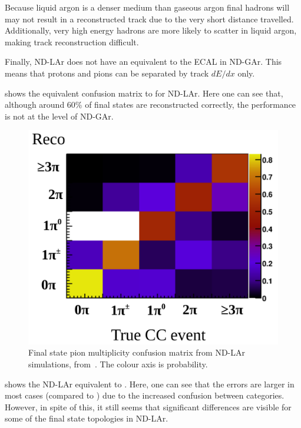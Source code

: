 Because liquid argon is a denser medium than gaseous argon final hadrons will may not result in a reconstructed track due to the very short distance travelled.
Additionally, very high energy hadrons are more likely to scatter in liquid argon, making track reconstruction difficult.

Finally, ND-LAr does not have an equivalent to the ECAL in ND-GAr.
This means that protons and pions can be separated by track $dE/dx$ only.

 shows the equivalent confusion matrix to  for ND-LAr.
Here one can see that, although around 60\% of final states are reconstructed correctly, the performance is not at the level of ND-GAr.

\begin{figure}[h]
	\centering
	\includegraphics[width=.6\linewidth]{files/figures/dune_ndrwt/larConfusMat}
	\caption[Final state pion multiplicity confusion matrix from ND-LAr simulations]{Final state pion multiplicity confusion matrix from ND-LAr simulations, from~\cite{ndCdr}. The colour axis is probability.}
	\label{fig:larConfusMat}
\end{figure}

 shows the ND-LAr equivalent to . 
Here, one can see that the errors are larger in most cases (compared to ) due to the increased confusion between categories.
However, in spite of this, it still seems that significant differences are visible for some of the final state topologies in ND-LAr.

